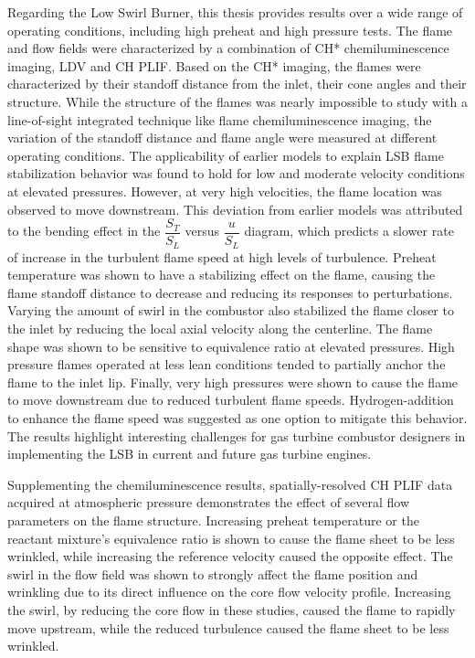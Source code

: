 Regarding the Low Swirl Burner, this thesis provides results over a wide range of operating conditions, including high preheat and high pressure tests. 
The flame and flow fields were characterized by a combination of CH* chemiluminescence imaging, LDV and CH PLIF.
Based on the CH* imaging, the flames were characterized by their standoff distance from the inlet, their cone angles and their structure.
While the structure of the flames was nearly impossible to study with a line-of-sight integrated technique like flame chemiluminescence imaging, the variation of the standoff distance and flame angle were measured at different operating conditions.
The applicability of earlier models to explain LSB flame stabilization behavior was found to hold for low and moderate velocity conditions at elevated pressures.
However, at very high velocities, the flame location was observed to move downstream.
This deviation from earlier models was attributed to the bending effect in the \(\dfrac{ S_T }{ S_L }\) versus \(\dfrac{ u }{ S_L}\) diagram, which predicts a slower rate of increase in the turbulent flame speed at high levels of turbulence.
Preheat temperature was shown to have a stabilizing effect on the flame, causing the flame standoff distance to decrease and reducing its responses to perturbations.
Varying the amount of swirl in the combustor also stabilized the flame closer to the inlet by reducing the local axial velocity along the centerline.
The flame shape was shown to be sensitive to equivalence ratio at elevated pressures.
High pressure flames operated at less lean conditions tended to partially anchor the flame to the inlet lip.
Finally, very high pressures were shown to cause the flame to move downstream due to reduced turbulent flame speeds.
Hydrogen-addition to enhance the flame speed was suggested as one option to mitigate this behavior.
The results highlight interesting challenges for gas turbine combustor designers in implementing the LSB in current and future gas turbine engines.

Supplementing the chemiluminescence results, spatially-resolved CH PLIF data acquired at atmospheric pressure demonstrates the effect of several flow parameters on the flame structure.
Increasing preheat temperature or the reactant mixture's equivalence ratio is shown to cause the flame sheet to be less wrinkled, while increasing the reference velocity caused the opposite effect.
The swirl in the flow field was shown to strongly affect the flame position and wrinkling due to its direct influence on the core flow velocity profile.
Increasing the swirl, by reducing the core flow in these studies, caused the flame to rapidly move upstream, while the reduced turbulence caused the flame sheet to be less wrinkled.

